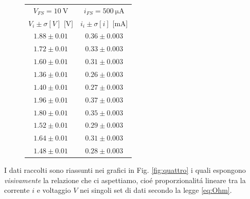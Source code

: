 \documentclass{article}
\begin{document}
\begin{figure}
\begin{multicols}{2}
\begin{center}
\begin{tabular}{c|c} 
$V_{FS}=\SI{10}{\volt}$&$i_{FS}=\SI{500}{\micro\ampere}$\\
$V_i \pm \sigma [V]$ [\si{\volt}] & $i_i \pm \sigma [i]$ [\si{\milli\ampere}]\\
[0.5ex]
\hline
$1.88 \pm 0.01 $&$0.36 \pm 0.003$\\

$1.72 \pm 0.01 $&$0.33 \pm 0.003$\\

$1.60 \pm 0.01 $&$0.31 \pm 0.003$\\

$1.36 \pm 0.01 $&$0.26 \pm 0.003$\\

$1.40 \pm 0.01 $&$0.27 \pm 0.003$\\

$1.96 \pm 0.01 $&$0.37 \pm 0.003$\\

$1.80 \pm 0.01 $&$0.35 \pm 0.003$\\

$1.52 \pm 0.01 $&$0.29 \pm 0.003$\\

$1.64 \pm 0.01 $&$0.31 \pm 0.003$\\

$1.48 \pm 0.01 $&$0.28 \pm 0.003$\\

\end{tabular}
\end{center}
\end{multicols}
\end{figure}

\newpage
I dati raccolti sono riassunti nei grafici in Fig. \ref{fig:quattro} i quali espongono \textit{visivamente} la relazione che ci aspettiamo, cio\'e proporzionalit\'a lineare tra la corrente $i$ e voltaggio $V$ nei singoli set di dati secondo la legge \ref{eq:Ohm}.\\
\end{document}

